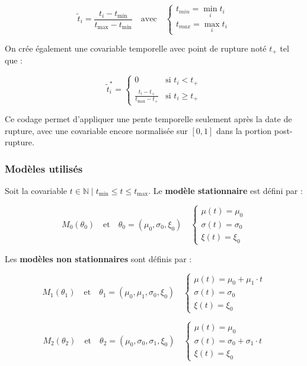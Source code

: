 \documentclass[
  article,
  nofooter,
  noheadings]{jss}
\begin{document}
\[
\tilde{t}_i = \frac{t_i - t_{\min}}{t_{\max} - t_{\min}} \quad \text{avec} \quad \begin{cases}
t_{min} = \min_i t_i \\
t_{max} = \max_i t_i
\end{cases}
\]

On crée également une covariable temporelle avec point de rupture noté
\(t_+\) tel que :

\[
\tilde{t}_{i}^\ast =
\begin{cases}
0 & \text{si } t_i < t_+ \\
\displaystyle \frac{t_i - t_+}{t_{\max} - t_+} & \text{si } t_i \ge t_+
\end{cases}
\]

Ce codage permet d'appliquer une pente temporelle seulement après la
date de rupture, avec une covariable encore normalisée sur \([0,1]\)
dans la portion post-rupture.

\subsubsection{Modèles utilisés}\label{moduxe8les-utilisuxe9s}

Soit la covariable
\(t \in \mathbb{N} \mid t_{\min} \leq t \leq t_{\max}\). Le
\textbf{modèle stationnaire} est défini par :

\[
M_0(\theta_0) \quad \text{et} \quad \theta_0 = (\mu_0, \sigma_0, \xi_0) \quad
\begin{cases}
\mu(t) = \mu_0 \\
\sigma(t) = \sigma_0 \\
\xi(t) = \xi_0
\end{cases}
\]

Les \textbf{modèles non stationnaires} sont définis par :

\[
M_1(\theta_1) \quad \text{et} \quad \theta_1 = (\mu_0, \mu_1, \sigma_0, \xi_0) \quad
\begin{cases}
\mu(t) = \mu_0 + \mu_1 \cdot t \\
\sigma(t) = \sigma_0 \\
\xi(t) = \xi_0
\end{cases}
\]

\[
M_2(\theta_2) \quad \text{et} \quad \theta_2 = (\mu_0, \sigma_0, \sigma_1, \xi_0)
\quad
\begin{cases}
\mu(t) = \mu_0 \\
\sigma(t) = \sigma_0 + \sigma_1 \cdot t \\
\xi(t) = \xi_0
\end{cases}
\]
\end{document}
